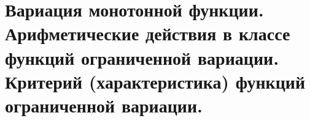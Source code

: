 \documentclass[../main.tex]{subfiles}
\begin{document}
\newpage
\section{Вариация монотонной функции. Арифметические действия в классе функций ограниченной вариации. Критерий (характеристика) функций ограниченной вариации.}
\end{document}
